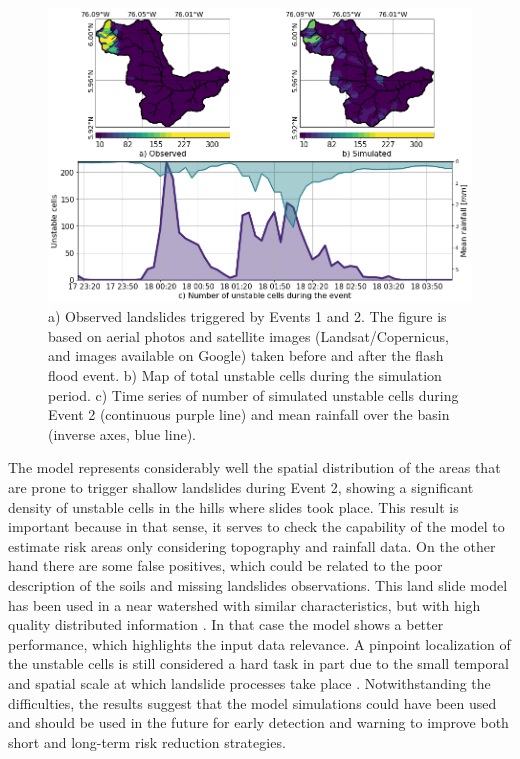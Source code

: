 \documentclass[hess, manuscript]{copernicus}
\begin{document}
\begin{figure}[t!]
\centering
 \includegraphics[width=12cm]{Figures/Slides_byHills.png}
 \caption{a)  Observed landslides triggered by Events 1 and 2. The figure is based on aerial photos and satellite images (Landsat/Copernicus, and images available on Google) taken before and after the flash flood event.  b) Map of total unstable cells during the simulation period. c) Time series of number of simulated unstable cells during Event 2 (continuous purple line) and mean rainfall over the basin (inverse axes, blue line).}
    \label{fig:SlidesComparison}
\end{figure}

The model represents considerably well the spatial distribution of the areas that are prone to trigger shallow landslides during Event 2, showing a significant density of unstable cells in the hills where slides took place.  This result is important because in that sense, it serves to check the capability of the model to estimate risk areas only considering topography and rainfall data. On the other hand there are some false positives, which could be related to the poor description of the soils and missing landslides observations. This land slide model has been used in a near watershed with similar characteristics, but with high quality distributed information \citep{Aristizabal2016}.  In that case the model shows a better performance, which highlights the input data relevance. A pinpoint localization of the unstable cells is still considered a hard task in part due to the small temporal and spatial scale at which landslide processes take place \citep{Aristizabal2016, Dhakal2004, Wu1995}. Notwithstanding the difficulties, the results suggest that the model simulations could have been used and should be used in the future for early detection and warning to improve both short and long-term risk reduction strategies.\\
\end{document}
